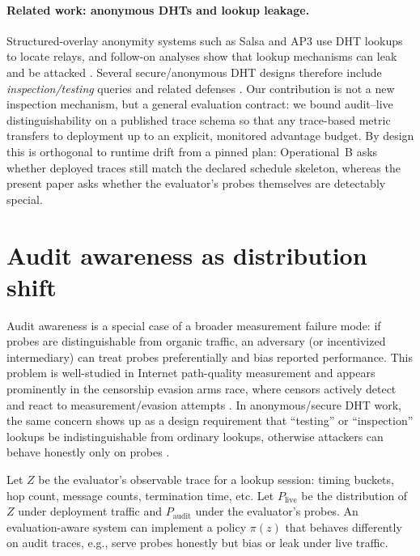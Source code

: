 \documentclass[11pt]{article}
\begin{document}
\paragraph{Related work: anonymous DHTs and lookup leakage.}
Structured-overlay anonymity systems such as Salsa \cite{salsa2006} and AP3 \cite{ap32004} use DHT lookups to locate relays, and follow-on analyses show that lookup mechanisms can leak and be attacked \cite{wangmittalborisov2010,mittalborisov2012}.
Several secure/anonymous DHT designs therefore include \emph{inspection/testing} queries and related defenses \cite{octopus2012,ipersea2014}.
Our contribution is not a new inspection mechanism, but a general evaluation contract: we bound audit--live distinguishability on a published trace schema so that any trace-based metric transfers to deployment up to an explicit, monitored advantage budget.
By design this is orthogonal to runtime drift from a pinned plan: Operational~B asks whether deployed traces still match the declared schedule skeleton, whereas the present paper asks whether the evaluator's probes themselves are detectably special.

\section{Audit awareness as distribution shift}

Audit awareness is a special case of a broader measurement failure mode: if probes are distinguishable from organic traffic,
an adversary (or incentivized intermediary) can treat probes preferentially and bias reported performance.
This problem is well-studied in Internet path-quality measurement \cite{goldberg2008pqm,tariq2009nano} and appears prominently in the censorship evasion arms race,
where censors actively detect and react to measurement/evasion attempts \cite{deresistor2023}.
In anonymous/secure DHT work, the same concern shows up as a design requirement that ``testing'' or ``inspection'' lookups be indistinguishable from ordinary lookups,
otherwise attackers can behave honestly only on probes \cite{octopus2012,ipersea2014,wangmittalborisov2010}.


Let $Z$ be the evaluator's observable trace for a lookup session: timing buckets, hop count, message counts, termination time, etc.
Let $P_{\mathrm{live}}$ be the distribution of $Z$ under deployment traffic and $P_{\mathrm{audit}}$ under the evaluator's probes.
An evaluation-aware system can implement a policy $\pi(z)$ that behaves differently on audit traces, e.g.,
serve probes honestly but bias or leak under live traffic.
\end{document}
